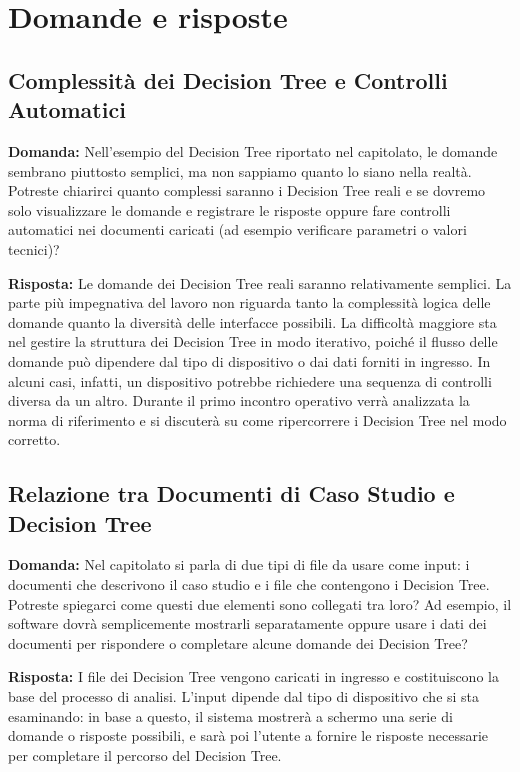 \documentclass[a4paper,12pt]{article}
\begin{document}
\section{Domande e risposte}{

    \subsection{Complessità dei Decision Tree e Controlli Automatici}
    \textbf{Domanda:} Nell'esempio del Decision Tree riportato nel capitolato, le domande sembrano piuttosto semplici, ma non sappiamo quanto lo siano nella realtà. Potreste chiarirci quanto complessi saranno i Decision Tree reali e se dovremo solo visualizzare le domande e registrare le risposte oppure fare controlli automatici nei documenti caricati (ad esempio verificare parametri o valori tecnici)?

    \textbf{Risposta:} Le domande dei Decision Tree reali saranno relativamente semplici. La parte più impegnativa del lavoro non riguarda tanto la complessità logica delle domande quanto la diversità delle interfacce possibili. La difficoltà maggiore sta nel gestire la struttura dei Decision Tree in modo iterativo, poiché il flusso delle domande può dipendere dal tipo di dispositivo o dai dati forniti in ingresso. In alcuni casi, infatti, un dispositivo potrebbe richiedere una sequenza di controlli diversa da un altro. Durante il primo incontro operativo verrà analizzata la norma di riferimento e si discuterà su come ripercorrere i Decision Tree nel modo corretto.

    \subsection{Relazione tra Documenti di Caso Studio e Decision Tree}
    \textbf{Domanda:} Nel capitolato si parla di due tipi di file da usare come input: i documenti che descrivono il caso studio e i file che contengono i Decision Tree. Potreste spiegarci come questi due elementi sono collegati tra loro? Ad esempio, il software dovrà semplicemente mostrarli separatamente oppure usare i dati dei documenti per rispondere o completare alcune domande dei Decision Tree?

    \textbf{Risposta:} I file dei Decision Tree vengono caricati in ingresso e costituiscono la base del processo di analisi. L'input dipende dal tipo di dispositivo che si sta esaminando: in base a questo, il sistema mostrerà a schermo una serie di domande o risposte possibili, e sarà poi l'utente a fornire le risposte necessarie per completare il percorso del Decision Tree. 
    
}
\end{document}
